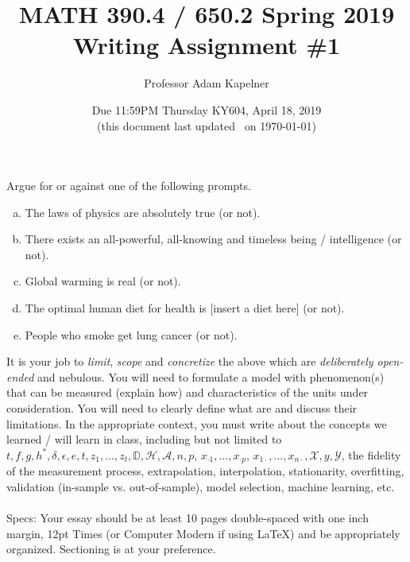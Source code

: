 \documentclass[12pt]{article}
\title{MATH 390.4 / 650.2 Spring 2019 \\ Writing Assignment \#1}
\author{Professor Adam Kapelner} %
\date{Due 11:59PM Thursday KY604, April 18, 2019 \\ \vspace{0.5cm} \small (this document last updated \currenttime~on \today)}
\begin{document}
\maketitle

\noindent Argue for or against one of the following prompts. 

\begin{enumerate}[(a)]
\item The laws of physics are absolutely true (or not).
\item There exists an all-powerful, all-knowing and timeless being / intelligence (or not).
\item Global warming is real (or not).
\item The optimal human diet for health is [insert a diet here] (or not).
\item People who smoke get lung cancer (or not).
\end{enumerate}

\noindent It is your job to \textit{limit}, \textit{scope} and \textit{concretize} the above which are \textit{deliberately open-ended} and nebulous. You will need to formulate a model with phenomenon(s) that can be measured (explain how) and characteristics of the units under consideration. You will need to clearly define what  are and discuss their limitations. In the appropriate context, you must write about the concepts we learned / will learn in class, including but not limited to $t ,f, g, h^*, \delta, \epsilon, e, t, z_1, \ldots, z_t, \mathbb{D}, \mathcal{H}, \mathcal{A}, n, p$, $x_{\cdot 1}, \ldots, x_{\cdot p}$, $x_{1 \cdot}, \ldots, x_{n \cdot}, \mathcal{X}, y, \mathcal{Y}$, the fidelity of the measurement process, extrapolation, interpolation, stationarity, overfitting, validation (in-sample vs. out-of-sample), model selection, machine learning, etc. \\
~\\
Specs: Your essay should be at least 10 pages double-spaced with one inch margin, 12pt Times (or Computer Modern if using \LaTeX) and be appropriately organized. Sectioning is at your preference.

\end{document}
